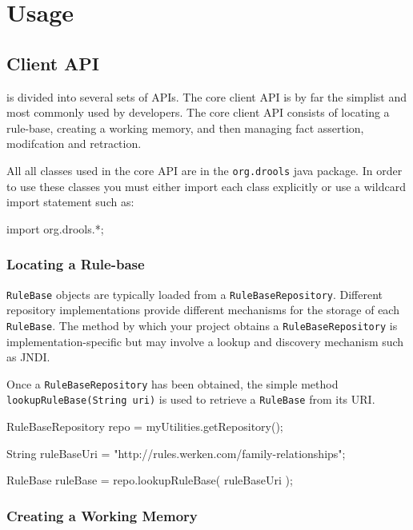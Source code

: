 \chapter{Usage}

\section{\drools{} Client API}

\drools{} is divided into several sets of APIs.  The core client API
is by far the simplist and most commonly used by developers.  The
core \drools{} client API consists of locating a rule-base, creating
a working memory, and then managing fact assertion, modifcation and
retraction.

All all classes used in the core \drools{} API are in the
\verb|org.drools| java package.  In order to use these classes
you must either import each class explicitly or use a wildcard
import statement such as:

\bigskip
\begin{codelisting}
import org.drools.*;
\end{codelisting}

\subsection{Locating a Rule-base}

\verb|RuleBase| objects are typically loaded from a
\verb|RuleBaseRepository|.  Different repository implementations
provide different mechanisms for the storage of each
\verb|RuleBase|.  The method by which your project obtains
a \verb|RuleBaseRepository| is implementation-specific but
may involve a lookup and discovery mechanism such as JNDI.

Once a \verb|RuleBaseRepository| has been obtained, the
simple method\\ \verb|lookupRuleBase(String uri)| is used
to retrieve a \verb|RuleBase| from its URI.

\bigskip
\begin{codelisting}
RuleBaseRepository repo = myUtilities.getRepository();

String ruleBaseUri = "http://rules.werken.com/family-relationships";

RuleBase ruleBase = repo.lookupRuleBase( ruleBaseUri );
\end{codelisting}

\newpage

\subsection{Creating a Working Memory}

